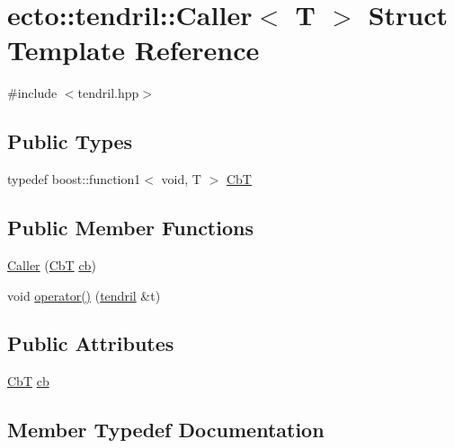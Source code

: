 \hypertarget{structecto_1_1tendril_1_1Caller}{}\section{ecto\+:\+:tendril\+:\+:Caller$<$ T $>$ Struct Template Reference}
\label{structecto_1_1tendril_1_1Caller}


{\ttfamily \#include $<$tendril.\+hpp$>$}

\subsection*{Public Types}
\begin{DoxyCompactItemize}
\item 
typedef boost\+::function1$<$ void, T $>$ \hyperlink{structecto_1_1tendril_1_1Caller_a846333ac5c22cfb6eafb1c2240c0c623}{Cb\+T}
\end{DoxyCompactItemize}
\subsection*{Public Member Functions}
\begin{DoxyCompactItemize}
\item 
\hyperlink{structecto_1_1tendril_1_1Caller_a84b71a5526ff59dcbd6cb7a102f8d9db}{Caller} (\hyperlink{structecto_1_1tendril_1_1Caller_a846333ac5c22cfb6eafb1c2240c0c623}{Cb\+T} \hyperlink{structecto_1_1tendril_1_1Caller_afecdbc09ca504c16292a6365ab1cd950}{cb})
\item 
void \hyperlink{structecto_1_1tendril_1_1Caller_a19099e68a2059823575e71f45b2c0b20}{operator()} (\hyperlink{classecto_1_1tendril}{tendril} \&t)
\end{DoxyCompactItemize}
\subsection*{Public Attributes}
\begin{DoxyCompactItemize}
\item 
\hyperlink{structecto_1_1tendril_1_1Caller_a846333ac5c22cfb6eafb1c2240c0c623}{Cb\+T} \hyperlink{structecto_1_1tendril_1_1Caller_afecdbc09ca504c16292a6365ab1cd950}{cb}
\end{DoxyCompactItemize}


\subsection{Member Typedef Documentation}
\hypertarget{structecto_1_1tendril_1_1Caller_a846333ac5c22cfb6eafb1c2240c0c623}{}
